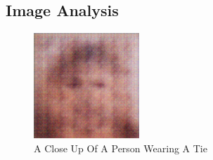 \documentclass{article}%
\begin{document}
%
\subsection{Image Analysis}%
\label{subsec:ImageAnalysis}%


\begin{figure}[h!]%
\centering%
\includegraphics[width=150px]{500_fake_images/samples_5_345.png}%
\caption{A Close Up Of A Person Wearing A Tie}%
\end{figure}

%
\end{document}
